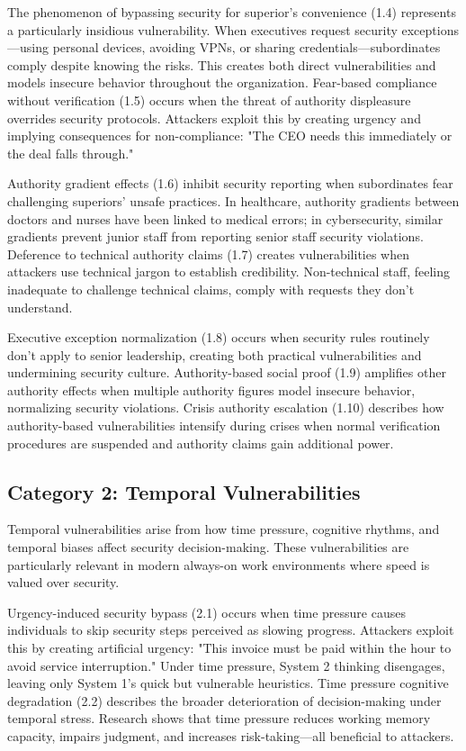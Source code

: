 \documentclass[11pt,a4paper]{article}
\begin{document}
The phenomenon of bypassing security for superior's convenience (1.4) represents a particularly insidious vulnerability. When executives request security exceptions—using personal devices, avoiding VPNs, or sharing credentials—subordinates comply despite knowing the risks. This creates both direct vulnerabilities and models insecure behavior throughout the organization. Fear-based compliance without verification (1.5) occurs when the threat of authority displeasure overrides security protocols. Attackers exploit this by creating urgency and implying consequences for non-compliance: "The CEO needs this immediately or the deal falls through."

Authority gradient effects (1.6) inhibit security reporting when subordinates fear challenging superiors' unsafe practices. In healthcare, authority gradients between doctors and nurses have been linked to medical errors; in cybersecurity, similar gradients prevent junior staff from reporting senior staff security violations. Deference to technical authority claims (1.7) creates vulnerabilities when attackers use technical jargon to establish credibility. Non-technical staff, feeling inadequate to challenge technical claims, comply with requests they don't understand.

Executive exception normalization (1.8) occurs when security rules routinely don't apply to senior leadership, creating both practical vulnerabilities and undermining security culture. Authority-based social proof (1.9) amplifies other authority effects when multiple authority figures model insecure behavior, normalizing security violations. Crisis authority escalation (1.10) describes how authority-based vulnerabilities intensify during crises when normal verification procedures are suspended and authority claims gain additional power.

\subsection{Category 2: Temporal Vulnerabilities}

Temporal vulnerabilities arise from how time pressure, cognitive rhythms, and temporal biases affect security decision-making. These vulnerabilities are particularly relevant in modern always-on work environments where speed is valued over security.

Urgency-induced security bypass (2.1) occurs when time pressure causes individuals to skip security steps perceived as slowing progress. Attackers exploit this by creating artificial urgency: "This invoice must be paid within the hour to avoid service interruption." Under time pressure, System 2 thinking disengages, leaving only System 1's quick but vulnerable heuristics. Time pressure cognitive degradation (2.2) describes the broader deterioration of decision-making under temporal stress. Research shows that time pressure reduces working memory capacity, impairs judgment, and increases risk-taking—all beneficial to attackers.
\end{document}
